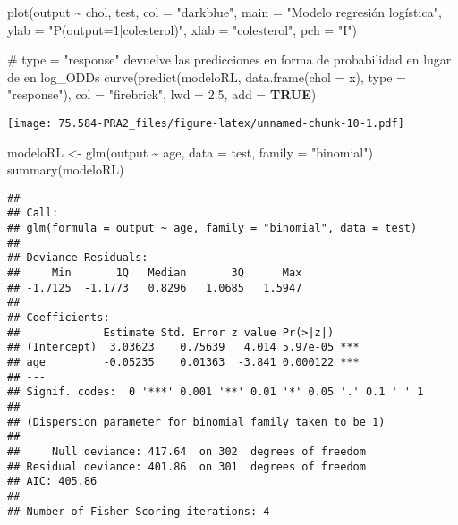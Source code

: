 \documentclass[
]{article}
\newenvironment{Shaded}{\begin{snugshade}}{\end{snugshade}}
\newcommand{\AttributeTok}[1]{\textcolor[rgb]{0.80,0.80,0.80}{#1}}
\newcommand{\CommentTok}[1]{\textcolor[rgb]{0.50,0.62,0.50}{#1}}
\newcommand{\ConstantTok}[1]{\textcolor[rgb]{0.86,0.64,0.64}{\textbf{#1}}}
\newcommand{\FloatTok}[1]{\textcolor[rgb]{0.75,0.75,0.82}{#1}}
\newcommand{\FunctionTok}[1]{\textcolor[rgb]{0.94,0.94,0.56}{#1}}
\newcommand{\NormalTok}[1]{\textcolor[rgb]{0.80,0.80,0.80}{#1}}
\newcommand{\OtherTok}[1]{\textcolor[rgb]{0.94,0.94,0.56}{#1}}
\newcommand{\SpecialCharTok}[1]{\textcolor[rgb]{0.86,0.64,0.64}{#1}}
\newcommand{\StringTok}[1]{\textcolor[rgb]{0.80,0.58,0.58}{#1}}
\begin{document}
\begin{Shaded}
\begin{Highlighting}[]
\FunctionTok{plot}\NormalTok{(output }\SpecialCharTok{\textasciitilde{}}\NormalTok{ chol, test, }\AttributeTok{col =} \StringTok{"darkblue"}\NormalTok{,}
     \AttributeTok{main =} \StringTok{"Modelo regresión logística"}\NormalTok{,}
     \AttributeTok{ylab =} \StringTok{"P(output=1|colesterol)"}\NormalTok{,}
     \AttributeTok{xlab =} \StringTok{"colesterol"}\NormalTok{, }\AttributeTok{pch =} \StringTok{"I"}\NormalTok{)}

\CommentTok{\# type = "response" devuelve las predicciones en forma de probabilidad en lugar de en log\_ODDs}
\FunctionTok{curve}\NormalTok{(}\FunctionTok{predict}\NormalTok{(modeloRL, }\FunctionTok{data.frame}\NormalTok{(}\AttributeTok{chol =}\NormalTok{ x), }\AttributeTok{type =} \StringTok{"response"}\NormalTok{),}
      \AttributeTok{col =} \StringTok{"firebrick"}\NormalTok{, }\AttributeTok{lwd =} \FloatTok{2.5}\NormalTok{, }\AttributeTok{add =} \ConstantTok{TRUE}\NormalTok{)}
\end{Highlighting}
\end{Shaded}

\texttt{[image: 75.584-PRA2\_files/figure-latex/unnamed-chunk-10-1.pdf]}

\begin{Shaded}
\begin{Highlighting}[]
\NormalTok{modeloRL }\OtherTok{\textless{}{-}} \FunctionTok{glm}\NormalTok{(output }\SpecialCharTok{\textasciitilde{}}\NormalTok{ age, }\AttributeTok{data =}\NormalTok{ test, }\AttributeTok{family =} \StringTok{"binomial"}\NormalTok{)}
\FunctionTok{summary}\NormalTok{(modeloRL)}
\end{Highlighting}
\end{Shaded}

\begin{verbatim}
## 
## Call:
## glm(formula = output ~ age, family = "binomial", data = test)
## 
## Deviance Residuals: 
##     Min       1Q   Median       3Q      Max  
## -1.7125  -1.1773   0.8296   1.0685   1.5947  
## 
## Coefficients:
##             Estimate Std. Error z value Pr(>|z|)    
## (Intercept)  3.03623    0.75639   4.014 5.97e-05 ***
## age         -0.05235    0.01363  -3.841 0.000122 ***
## ---
## Signif. codes:  0 '***' 0.001 '**' 0.01 '*' 0.05 '.' 0.1 ' ' 1
## 
## (Dispersion parameter for binomial family taken to be 1)
## 
##     Null deviance: 417.64  on 302  degrees of freedom
## Residual deviance: 401.86  on 301  degrees of freedom
## AIC: 405.86
## 
## Number of Fisher Scoring iterations: 4
\end{verbatim}
\end{document}
